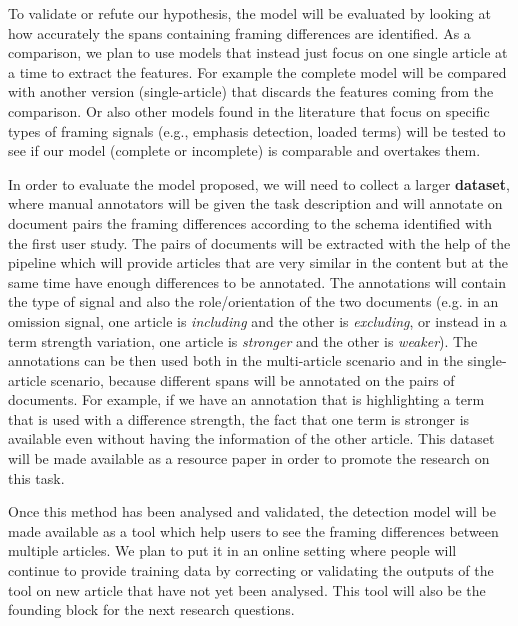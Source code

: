 To validate or refute our hypothesis, the model will be evaluated by looking at how accurately the spans containing framing differences are identified.
As a comparison, we plan to use models that instead just focus on one single article at a time to extract the features.
For example the complete model will be compared with another version (single-article) that discards the features coming from the comparison.
Or also other models found in the literature that focus on specific types of framing signals (e.g., emphasis detection, loaded terms) will be tested to see if our model (complete or incomplete) is comparable and overtakes them.


In order to evaluate the model proposed, we will need to collect a larger \textbf{dataset}, where manual annotators will be given the task description and will annotate on document pairs the framing differences according to the schema identified with the first user study.
The pairs of documents will be extracted with the help of the pipeline which will provide articles that are very similar in the content but at the same time have enough differences to be annotated. %
The annotations will contain the type of signal and also the role/orientation of the two documents (e.g. in an omission signal, one article is \textit{including} and the other is \textit{excluding}, or instead in a term strength variation, one article is \textit{stronger} and the other is \textit{weaker}).
The annotations can be then used both in the multi-article scenario and in the single-article scenario, because different spans will be annotated on the pairs of documents.
For example, if we have an annotation that is highlighting a term that is used with a difference strength, the fact that one term is stronger is available even without having the information of the other article.
This dataset will be made available as a resource paper in order to promote the research on this task.

Once this method has been analysed and validated, the detection model will be made available as a tool which help users to see the framing differences between multiple articles.
We plan to put it in an online setting where people will continue to provide training data by correcting or validating the outputs of the tool on new article that have not yet been analysed.
This tool will also be the founding block for the next research questions.

